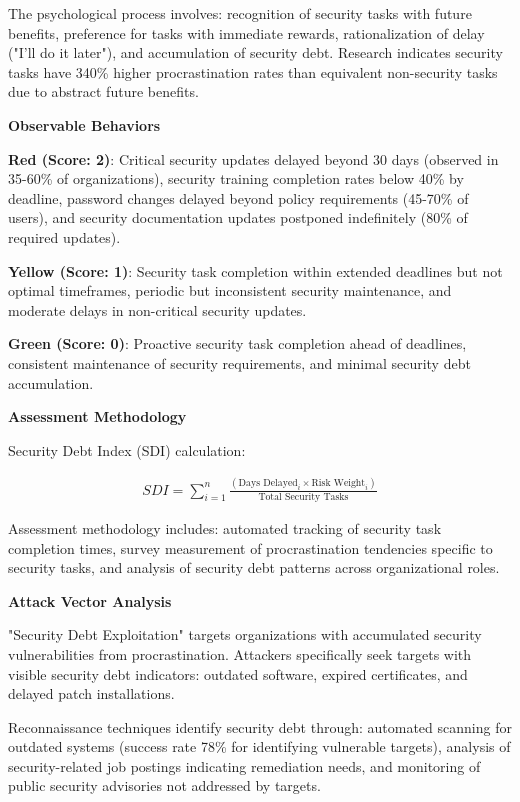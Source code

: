 \documentclass[11pt,a4paper]{article}
\begin{document}
The psychological process involves: recognition of security tasks with future benefits, preference for tasks with immediate rewards, rationalization of delay ("I'll do it later"), and accumulation of security debt. Research indicates security tasks have 340\% higher procrastination rates than equivalent non-security tasks due to abstract future benefits.

\textbf{Observable Behaviors}

\textbf{Red (Score: 2)}: Critical security updates delayed beyond 30 days (observed in 35-60\% of organizations), security training completion rates below 40\% by deadline, password changes delayed beyond policy requirements (45-70\% of users), and security documentation updates postponed indefinitely (80\% of required updates).

\textbf{Yellow (Score: 1)}: Security task completion within extended deadlines but not optimal timeframes, periodic but inconsistent security maintenance, and moderate delays in non-critical security updates.

\textbf{Green (Score: 0)}: Proactive security task completion ahead of deadlines, consistent maintenance of security requirements, and minimal security debt accumulation.

\textbf{Assessment Methodology}

Security Debt Index (SDI) calculation:

\begin{align}
SDI = \sum_{i=1}^{n} \frac{(\text{Days Delayed}_i \times \text{Risk Weight}_i)}{\text{Total Security Tasks}}
\end{align}

Assessment methodology includes: automated tracking of security task completion times, survey measurement of procrastination tendencies specific to security tasks, and analysis of security debt patterns across organizational roles.

\textbf{Attack Vector Analysis}

"Security Debt Exploitation" targets organizations with accumulated security vulnerabilities from procrastination. Attackers specifically seek targets with visible security debt indicators: outdated software, expired certificates, and delayed patch installations.

Reconnaissance techniques identify security debt through: automated scanning for outdated systems (success rate 78\% for identifying vulnerable targets), analysis of security-related job postings indicating remediation needs, and monitoring of public security advisories not addressed by targets.
\end{document}
